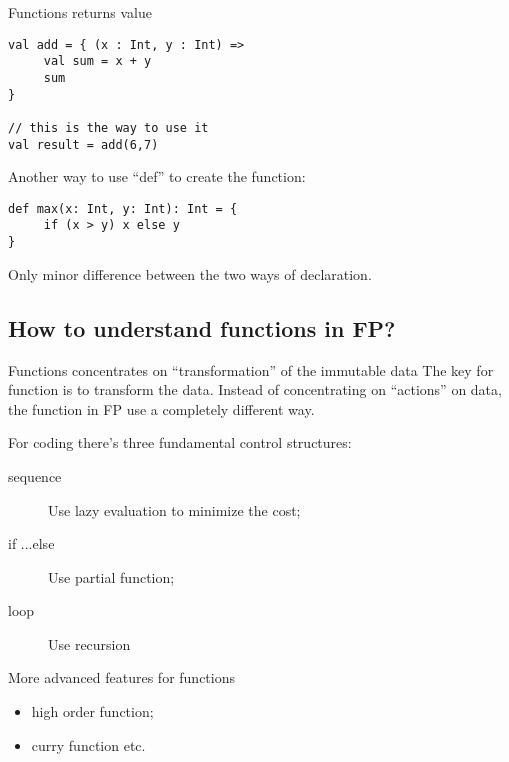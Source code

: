 \documentclass[notheorems, aspectratio=54]{beamer}
\begin{document}
\begin{frame}[fragile]

\begin{block}{Functions returns value}
\begin{verbatim}
val add = { (x : Int, y : Int) => 
     val sum = x + y
     sum
}

// this is the way to use it
val result = add(6,7)
\end{verbatim}
\end{block}

Another way to use ``def'' to create the function:
\begin{verbatim}
def max(x: Int, y: Int): Int = {
     if (x > y) x else y
}
\end{verbatim}
Only minor difference between the two ways of declaration. 
 
\end{frame}

\subsection{How to understand functions in FP?}
\begin{frame}[fragile]

\begin{alertblock}{Functions concentrates on ``transformation'' of the immutable data}
 The key for function is to transform the data. Instead of concentrating on ``actions'' on 
 data, the function in FP use a completely different way.
 
 For coding there's three fundamental control structures:
 \begin{description}
  \item [sequence] Use lazy evaluation to minimize the cost;
  \item [if ...else]  Use partial function;
  \item [loop] Use recursion
 \end{description}
\end{alertblock}

More advanced features for functions
 \begin{itemize}
  \item high order function;
  \item curry function etc.
 \end{itemize}

\end{frame}
\end{document}
